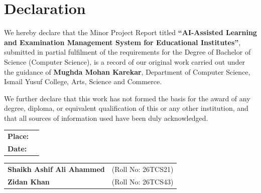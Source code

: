 \chapter*{Declaration}

We hereby declare that the Minor Project Report titled
\textbf{``AI-Assisted Learning and Examination Management System for
Educational Institutes''}, submitted in partial fulfilment of the
requirements for the Degree of Bachelor of Science (Computer Science), is a
record of our original work carried out under the guidance of \textbf{Mughda
Mohan Karekar}, Department of Computer Science, Ismail Yusuf College, Arts,
Science and Commerce.

We further declare that this work has not formed the basis for the award of
any degree, diploma, or equivalent qualification of this or any other
institution, and that all sources of information used have been duly
acknowledged.

\vspace{1.0cm}

\begin{tabular}{ll}
\textbf{Place:} & \\[0.4em]
\textbf{Date:}  & \\
\end{tabular}

\vspace{2.2cm}

\begin{tabular}{ll}
\textbf{Shaikh Ashif Ali Ahammed} & (Roll No: 26TCS21) \\
\textbf{Zidan Khan}                & (Roll No: 26TCS43) \\
\end{tabular}